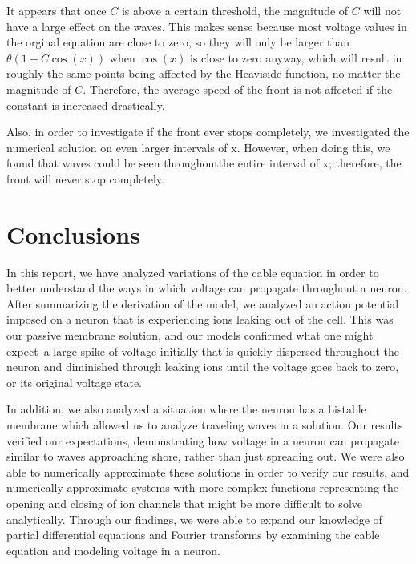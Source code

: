 \documentclass[12pt]{article}
\begin{document}
It appears that once $C$ is above a certain threshold, the magnitude of $C$ will not have a large effect on the waves. This makes sense because most voltage values in the orginal equation are close to zero, so they will only be larger than $\theta(1+C\cos(x))$ when $\cos(x)$ is close to zero anyway, which will result in roughly the same points being affected by the Heaviside function, no matter the magnitude of $C$. Therefore, the average speed of the front is not affected if the constant is increased drastically. \par
Also, in order to investigate if the front ever stops completely, we investigated the numerical solution on even larger intervals of x. However, when doing this, we found that waves could be seen throughoutthe entire interval of x; therefore, the front will never stop completely. 

\section{Conclusions}
In this report, we have analyzed variations of the cable equation in order to better understand the ways in which voltage can propagate throughout a neuron. After summarizing the derivation of the model, we analyzed an action potential imposed on a neuron that is experiencing ions leaking out of the cell. This was our passive membrane solution, and our models confirmed what one might expect--a large spike of voltage initially that is quickly dispersed throughout the neuron and diminished through leaking ions until the voltage goes back to zero, or its original voltage state. \par
In addition, we also analyzed a situation where the neuron has a bistable membrane which allowed us to analyze traveling waves in a solution. Our results verified our expectations, demonstrating how voltage in a neuron can propagate similar to waves approaching shore, rather than just spreading out. We were also able to numerically approximate these solutions in order to verify our results, and numerically approximate systems with more complex functions representing the opening and closing of ion channels that might be more difficult to solve analytically. Through our findings, we were able to expand our knowledge of partial differential equations and Fourier transforms by examining the cable equation and modeling voltage in a neuron. 


\pagebreak
\end{document}
